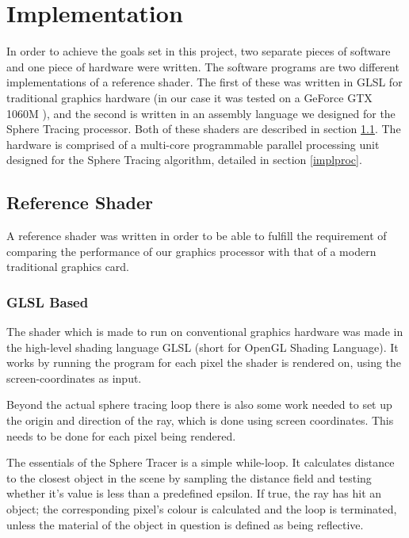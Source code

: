 \chapter{Implementation}
	
	In order to achieve the goals set in this project, two separate pieces of 
	software and one piece of hardware were written. The software programs are 
	two different implementations of a reference shader. The first of these was 
	written in GLSL for traditional graphics hardware (in our case it was 
	tested on a GeForce GTX 1060M ), and the second is written in an assembly 
	language we designed for the Sphere Tracing processor. Both of these 
	shaders are described in section \ref{implshader}. The hardware is 
	comprised of a multi-core programmable parallel processing unit designed 
	for the Sphere Tracing algorithm, detailed in section \ref{implproc}.

	\section{Reference Shader} \label{implshader}
	A reference shader was written in order to be able to fulfill the
	requirement of comparing the performance of our graphics processor with
	that of a modern traditional graphics card.
	
	\subsection{GLSL Based}
	The shader which is made to run on conventional graphics hardware
	was made in the high-level shading language GLSL (short for 
	OpenGL Shading Language). It works by running the program for
	each pixel the shader is rendered on, using the screen-coordinates 
	as input.
	
	Beyond the actual sphere tracing loop there is also some work needed to set 
	up the origin and direction of the ray, which is done using screen 
	coordinates. This needs to be done for each pixel being rendered.
	
	The essentials of the Sphere Tracer is a simple while-loop. It 
	calculates distance to the closest object in the scene by sampling 
	the distance field and testing whether it's value is less than a 
	predefined epsilon. If true, the ray has hit an object; the 
	corresponding pixel's colour is calculated and the loop is 
	terminated, unless the material of the object in question is defined
	as being reflective.

